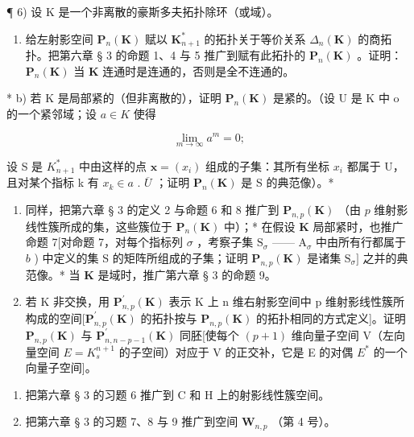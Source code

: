 ¶ 6) 设 K 是一个非离散的豪斯多夫拓扑除环（或域）。

\begin{enumerate}
\def\labelenumi{\alph{enumi})}
\tightlist
\item
  给左射影空间 \(\mathbf{P}_n(\mathbf{K})\) 赋以 \(\mathbf{K}_{n+1}^*\) 的拓扑关于等价关系 \(\Delta_n(\mathbf{K})\) 的商拓扑。把第六章 § 3 的命题 1、4 与 5 推广到赋有此拓扑的 \(\mathbf{P}_n(\mathbf{K})\) 。证明：\(\mathbf{P}_n(\mathbf{K})\) 当 \(\mathbf{K}\) 连通时是连通的，否则是全不连通的。
\end{enumerate}

* b) 若 K 是局部紧的（但非离散的），证明 \(\mathbf{P}_{n}(\mathbf{K})\) 是紧的。（设 U 是 K 中 o 的一个紧邻域；设 \(a \in K\) 使得

\[
\lim _ {m \rightarrow \infty} a ^ {m} = 0;
\]

设 S 是 \(K_{n+1}^{*}\) 中由这样的点 \(\boldsymbol{x} = (x_{i})\) 组成的子集：其所有坐标 \(x_{i}\) 都属于 U，且对某个指标 k 有 \(x_{k} \in a\) . \(\overline{U}\) ；证明 \(\mathbf{P}_{n}(\mathbf{K})\) 是 S 的典范像）。*

\begin{enumerate}
\def\labelenumi{\alph{enumi})}
\setcounter{enumi}{2}
\item
  同样，把第六章 § 3 的定义 2 与命题 6 和 8 推广到 \(\mathbf{P}_{n,p}(\mathbf{K})\) （由 \(p\) 维射影线性簇所成的集，这些簇位于 \(\mathbf{P}_n(\mathbf{K})\) 中）；* 在假设 \(\mathbf{K}\) 局部紧时，也推广命题 7{[}对命题 7，对每个指标列 \(\sigma\) ，考察子集 \(\mathrm{S}_{\sigma}\) —— \(\mathrm{A}_{\sigma}\) 中由所有行都属于 \(b\) ) 中定义的集 S 的矩阵所组成的子集；证明 \(\mathbf{P}_{n,p}(\mathbf{K})\) 是诸集 \(\mathrm{S}_{\sigma}]\) 之并的典范像。* 当 \(\mathbf{K}\) 是域时，推广第六章 § 3 的命题 9。
\item
  若 K 非交换，用 \(\mathbf{P}_{n,p}^{\prime}(\mathbf{K})\) 表示 K 上 n 维右射影空间中 p 维射影线性簇所构成的空间{[}\(\mathbf{P}_{n,p}^{\prime}(\mathbf{K})\) 的拓扑按与 \(\mathbf{P}_{n,p}(\mathbf{K})\) 的拓扑相同的方式定义{]}。证明 \(\mathbf{P}_{n,p}(\mathbf{K})\) 与 \(\mathbf{P}_{n,n-p-1}^{\prime}(\mathbf{K})\) 同胚{[}使每个 \((p+1)\) 维向量子空间 V（左向量空间 \(E=K_{s}^{n+1}\) 的子空间）对应于 V 的正交补，它是 E 的对偶 \(E^{*}\) 的一个向量子空间{]}。
\end{enumerate}

\begin{enumerate}
\def\labelenumi{\arabic{enumi})}
\setcounter{enumi}{6}
\item
  把第六章 § 3 的习题 6 推广到 C 和 H 上的射影线性簇空间。
\item
  把第六章 § 3 的习题 7、8 与 9 推广到空间 \(\mathbf{W}_{n,p}\) （第 4 号）。
\end{enumerate}

